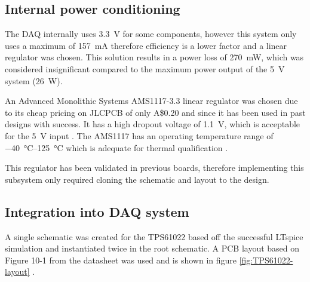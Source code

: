 \documentclass[draft]{report}
\newcommand{\aud}{A\$}
\begin{document}
\subsection{Internal power conditioning}

The DAQ internally uses \SI{3.3}{\volt} for some components, however this system only uses a maximum of \SI{157}{\milli\ampere} therefore efficiency is a lower factor and a linear regulator was chosen. This solution results in a power loss of \SI{270}{\milli\watt}, which was considered insignificant compared to the maximum power output of the \SI{5}{\volt} system (\SI{26}{\watt}). %

An Advanced Monolithic Systems AMS1117-3.3 linear regulator was chosen due to its cheap pricing on JLCPCB of only \aud 0.20 and since it has been used in past designs with success. It has a high dropout voltage of \SI{1.1}{\volt}, which is acceptable for the \SI{5}{\volt} input \cite{ams2007ams1117}. The AMS1117 has an operating temperature range of \SIrange{-40}{125}{\degreeCelsius} which is adequate for thermal qualification \cite{ams2007ams1117}.

This regulator has been validated in previous boards, therefore implementing this subsystem only required cloning the schematic and layout to the design.

\subsection{Integration into DAQ system}

A single schematic was created for the TPS61022 based off the successful LTspice simulation and instantiated twice in the root schematic. A PCB layout based on Figure 10-1 from the datasheet was used and is shown in figure \ref{fig:TPS61022-layout} \cite{ti2021tps61022}.
\end{document}

